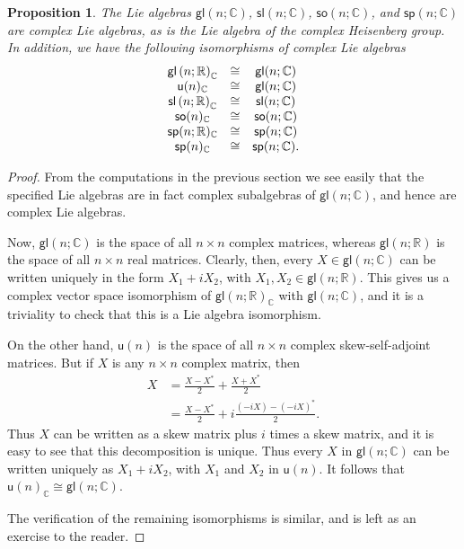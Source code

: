 \documentclass[12pt]{amsbook}
\theoremstyle{plain}
\newtheorem{proposition}[theorem]{Proposition}
\numberwithin{equation}{chapter}
\numberwithin{theorem}{chapter}
\begin{document}
\begin{proposition}
\label{complex.classical}The Lie algebras $\mathsf{gl}(n;\mathbb{C})$,
$\mathsf{sl}(n;\mathbb{C})$, $\mathsf{so}(n;\mathbb{C})$, and $\mathsf{sp}%
(n;\mathbb{C})$ are complex Lie algebras, as is the Lie algebra of the complex
Heisenberg group. In addition, we have the following isomorphisms of complex
Lie algebras
\[%
\begin{array}
[c]{ccc}%
\mathsf{gl}\left(  n;\mathbb{R}\right)  _{\mathbb{C}} & \cong & \mathsf{gl}%
(n;\mathbb{C})\\
\mathsf{u}(n)_{\mathbb{C}} & \cong & \mathsf{gl}(n;\mathbb{C})\\
\mathsf{sl}\left(  n;\mathbb{R}\right)  _{\mathbb{C}} & \cong & \mathsf{sl}%
(n;\mathbb{C})\\
\mathsf{so}(n)_{\mathbb{C}} & \cong & \mathsf{so}(n;\mathbb{C})\\
\mathsf{sp}(n;\mathbb{R})_{\mathbb{C}} & \cong & \mathsf{sp}(n;\mathbb{C})\\
\mathsf{sp}(n)_{\mathbb{C}} & \cong & \mathsf{sp}(n;\mathbb{C})\text{.}%
\end{array}
\]
\end{proposition}

\begin{proof}
From the computations in the previous section we see easily that the specified
Lie algebras are in fact complex subalgebras of $\mathsf{gl}(n;\mathbb{C})$,
and hence are complex Lie algebras.

Now, $\mathsf{gl}(n;\mathbb{C})$ is the space of all $n\times n$ complex
matrices, whereas $\mathsf{gl}\left(  n;\mathbb{R}\right)  $ is the space of
all $n\times n$ real matrices. Clearly, then, every $X\in\mathsf{gl}\left(
n;\mathbb{C}\right)  $ can be written uniquely in the form $X_{1}+iX_{2}$,
with $X_{1},X_{2}\in\mathsf{gl}\left(  n;\mathbb{R}\right)  $. This gives us a
complex vector space isomorphism of $\mathsf{gl}\left(  n;\mathbb{R}\right)
_{\mathbb{C}}$ with $\mathsf{gl}(n;\mathbb{C})$, and it is a triviality to
check that this is a Lie algebra isomorphism.

On the other hand, $\mathsf{u}(n)$ is the space of all $n\times n$ complex
skew-self-adjoint matrices. But if $X$ is any $n\times n$ complex matrix,
then
\begin{align*}
X  & =\frac{X-X^{\ast}}{2}+\frac{X+X^{\ast}}{2}\\
& =\frac{X-X^{\ast}}{2}+i\frac{(-iX)-(-iX)^{\ast}}{2}\text{.}%
\end{align*}
Thus $X$ can be written as a skew matrix plus $i$ times a skew matrix, and it
is easy to see that this decomposition is unique. Thus every $X$ in
$\mathsf{gl}(n;\mathbb{C})$ can be written uniquely as $X_{1}+iX_{2}$, with
$X_{1}$ and $X_{2}$ in $\mathsf{u}(n)$. It follows that $\mathsf{u}%
(n)_{\mathbb{C}}\cong\mathsf{gl}(n;\mathbb{C})$.

The verification of the remaining isomorphisms is similar, and is left as an
exercise to the reader.
\end{proof}
\end{document}
